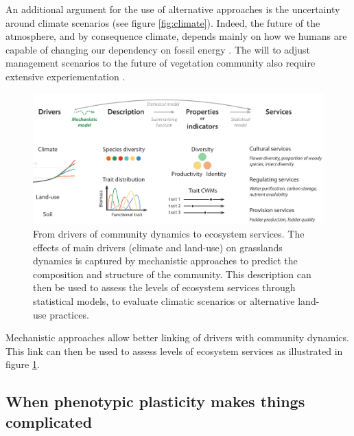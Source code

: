  An additional argument for the use of alternative approaches is the uncertainty around climate scenarios (see figure \ref{fig:climate}). Indeed, the future of the atmosphere, and by consequence climate, depends mainly on how we humans are capable of changing our dependency on fossil energy \parencite{intergovernmental_panel_on_climate_change_climate_2014}. The will to adjust management scenarios to the future of vegetation community \parencite{schirpke_multiple_2013} also require extensive experiementation \parencite{rodriguez_lingra-cc:_1999, martin_simulations_2012, deleglise_drought-induced_2015}.
 
 
 
\begin{figure}
    \includegraphics[width=1\linewidth]{./1_Introduction/graphics/drivers_to_services.pdf}
  \caption[From drivers to ecosystem services]{From drivers of community dynamics to ecosystem services. The effects of main drivers (climate and land-use) on grasslands dynamics is captured by mechanistic approaches to predict the composition and structure of the community. This description can then be used to assess the levels of ecosystem services through statistical models, to evaluate climatic scenarios or alternative land-use practices.}
  \label{fig:drivers2services}
\end{figure}

Mechanistic approaches allow better linking of drivers with community dynamics. This link can then be used to assess levels of ecosystem services as illustrated in figure \ref{fig:drivers2services}\parencite{bello_towards_2010, lavorel_using_2011}.




\subsection{When phenotypic plasticity makes things complicated}


